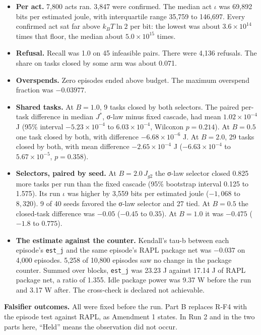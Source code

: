 \documentclass[
  10pt,
]{article}
\providecommand{\tightlist}{%
  \setlength{\itemsep}{0pt}\setlength{\parskip}{0pt}}
\begin{document}
\begin{itemize}
\tightlist
\item
  \textbf{Per act.} 7,800 acts ran. 3,847 were confirmed. The median act
  \(\iota\) was 69,892 bits per estimated joule, with interquartile
  range 35,759 to 146,697. Every confirmed act sat far above
  \(k_B T\ln 2\) per bit: the lowest was about \(3.6 \times 10^{14}\)
  times that floor, the median about \(5.0 \times 10^{15}\) times.
\item
  \textbf{Refusal.} Recall was 1.0 on 45 infeasible pairs. There were
  4,136 refusals. The share on tasks closed by some arm was about 0.071.
\item
  \textbf{Overspends.} Zero episodes ended above budget. The maximum
  overspend fraction was \(-0.03977\).
\item
  \textbf{Shared tasks.} At \(B = 1.0\), 9 tasks closed by both
  selectors. The paired per-task difference in median \(J^*\), σ-law
  minus fixed cascade, had mean \(1.02 \times 10^{-4}\) J (95\% interval
  \(-5.23 \times 10^{-4}\) to \(6.03 \times 10^{-4}\), Wilcoxon
  \(p = 0.214\)). At \(B = 0.5\) one task closed by both, with
  difference \(-6.68 \times 10^{-6}\) J. At \(B = 2.0\), 29 tasks closed
  by both, with mean difference \(-2.65 \times 10^{-4}\) J
  (\(-6.63 \times 10^{-4}\) to \(5.67 \times 10^{-5}\), \(p = 0.358\)).
\item
  \textbf{Selectors, paired by seed.} At \(B = 2.0\,J_{g2}\) the σ-law
  selector closed 0.825 more tasks per run than the fixed cascade (95\%
  bootstrap interval 0.125 to 1.575). Its run \(\iota\) was higher by
  3,559 bits per estimated joule (\(-1,068\) to \(8,320\)). 9 of 40
  seeds favored the σ-law selector and 27 tied. At \(B = 0.5\) the
  closed-task difference was \(-0.05\) (\(-0.45\) to \(0.35\)). At
  \(B = 1.0\) it was \(-0.475\) (\(-1.8\) to \(0.775\)).
\item
  \textbf{The estimate against the counter.} Kendall's tau-b between
  each episode's \texttt{est\_j} and the same episode's RAPL package net
  was \(-0.037\) on 4,000 episodes. 5,258 of 10,800 episodes saw no
  change in the package counter. Summed over blocks, \texttt{est\_j} was
  23.23 J against 17.14 J of RAPL package net, a ratio of 1.355. Idle
  package power was 9.37 W before the run and 3.17 W after. The
  cross-check is declared not achievable.
\end{itemize}

\textbf{Falsifier outcomes.} All were fixed before the run. Part B
replaces R-F4 with the episode test against RAPL, as Amendment 1 states.
In Run 2 and in the two parts here, ``Held'' means the observation did
not occur.
\end{document}
